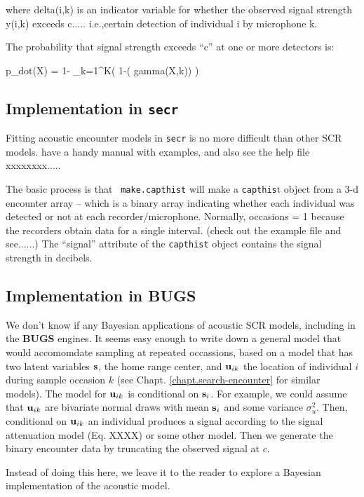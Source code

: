 where delta(i,k) is an indicator variable for whether the observed
signal strength y(i,k) exceeds c..... i.e.,certain detection of
individual i by microphone k. 

The probability that signal strength exceeds ``c'' at one or more
detectors is:

p_{dot}(X) = 1- \prod_{k=1}^{K}(   1-\phi(  gamma(X,k)) ) 


\subsection{Implementation in \mbox{\tt secr}}

Fitting acoustic encounter models in \mbox{\tt secr} is no more
difficult than other SCR models. \citet{efford_dawson:2010} have a
handy manual with examples, and also see the help file xxxxxxxx.....

The basic process is that \mbox{\tt 
make.capthist} will make a \mbox{\tt capthis}t object from a 3-d encounter
array  -- which is a binary array indicating whether each individual
was
detected or not at each recorder/microphone. Normally, 
occasions = 1 because the recorders obtain data for a single
interval.  (check out the example file and see......)
The ``signal'' attribute of the \mbox{\tt capthist} object contains the signal
strength in decibels. 


\subsection{Implementation in {\bf BUGS}}

We don't know if any Bayesian applications of acoustic SCR models,
including 
 in the {\bf BUGS} engines.  It seems easy enough to write down a
 general model that would accomomdate sampling at repeated
 occassions, based on a model that has two latent variables ${\bf s}$, the home range
 center, and ${\bf u}_{ik}$ the location of individual $i$ during
 sample occasion $k$ (see
 Chapt. \ref{chapt.search-encounter} for similar models). The model
 for ${\bf u}_{ik}$ is conditional on ${\bf s}_{i}$. For example, we
 could assume that ${\bf u}_{ik}$ are bivariate normal draws with mean
 ${\bf s}_{i}$ and some variance $\sigma_{u}^{2}$. Then,
 conditional on ${\bf u}_{ik}$ an individual produces a signal
 according to the signal attenuation model (Eq. XXXX) or some other
 model. Then we generate the binary encounter data by truncating the
 observed signal at $c$. 

 Instead of doing this here, we leave it to the reader to explore a
 Bayesian implementation of the acoustic model. 





